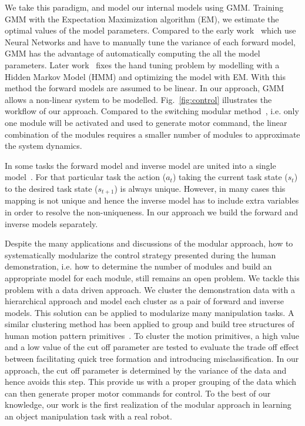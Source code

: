 We take this paradigm, and model our internal models using GMM. Training GMM with the Expectation Maximization algorithm (EM), we estimate the optimal values of the model parameters. Compared to the early work~\cite{wolpert1998multiple} which use Neural Networks and have to manually tune the variance of each forward model, GMM has the advantage of automatically computing the all the model parameters. Later work~\cite{haruno2001mosaic} fixes the hand tuning problem by modelling with a Hidden Markov Model (HMM) and optimizing the model with EM. With this method the forward models are assumed to be linear. In our approach, GMM allows a non-linear system to be modelled. Fig.~\ref{fig:control} illustrates the workflow of our approach. Compared to the switching modular method~\cite{narendra1997adaptive}, i.e. only one module will be activated and used to generate motor command, the linear combination of the modules requires a smaller number of modules to approximate the system dynamics.

In some tasks the forward model and inverse model are united into a single model~\cite{petkos2006learning}. For that particular task the action ($a_t$) taking the current task state ($s_t$) to the desired task state ($s_{t+1}$) is always unique. However, in many cases this mapping is not unique and hence the inverse model has to include extra variables in order to resolve the non-uniqueness. In our approach we build the forward and inverse models separately.

Despite the many applications and discussions of the modular approach, how to systematically modularize the control strategy presented during the human demonstration, i.e. how to determine the number of modules and build an appropriate model for each module, still remains an open problem. We tackle this problem with a data driven approach. We cluster the demonstration data with a hierarchical approach and model each cluster as a pair of forward and inverse models. This solution can be applied to modularize many manipulation tasks. A similar clustering method has been applied to group and build tree structures of human motion pattern primitives~\cite{kulic2008incremental}. To cluster the motion primitives, a high value and a low value of the cut off parameter are tested to evaluate the trade off effect between facilitating quick tree formation and introducing misclassification. In our approach, the cut off parameter is determined by the variance of the data and hence avoids this step. This provide us with a proper grouping of the data which can then generate proper motor commands for control. To the best of our knowledge, our work is the first realization of the modular approach in learning an object manipulation task with a real robot.

